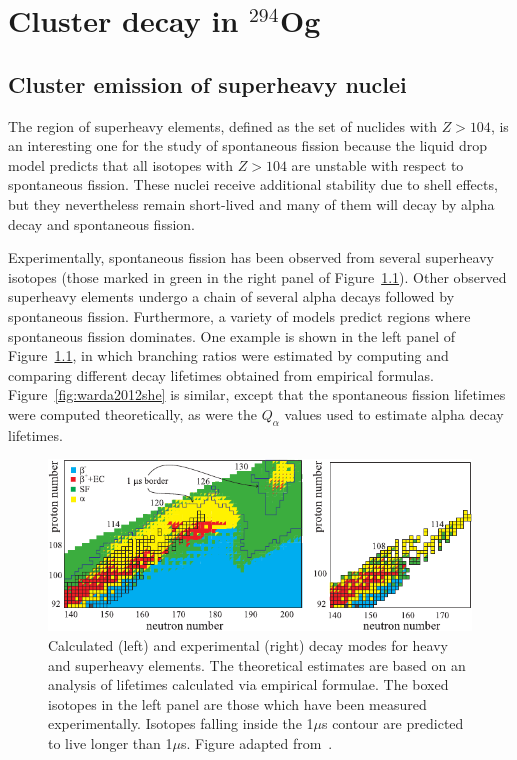 \chapter{Cluster decay in $^{294}$Og}\label{chap:294Og}

\section{Cluster emission of superheavy nuclei}

The region of superheavy elements, defined as the set of nuclides with $Z>104$, is an interesting one for the study of spontaneous fission because the liquid drop model predicts that all isotopes with $Z>104$ are unstable with respect to spontaneous fission. These nuclei receive additional stability due to shell effects, but they nevertheless remain short-lived and many of them will decay by alpha decay and spontaneous fission.

Experimentally, spontaneous fission has been observed from several superheavy isotopes (those marked in green in the right panel of Figure~\ref{fig:karpovshedecay}). Other observed superheavy elements undergo a chain of several alpha decays followed by spontaneous fission. Furthermore, a variety of models predict regions where spontaneous fission dominates. One example is shown in the left panel of Figure~\ref{fig:karpovshedecay}, in which branching ratios were estimated by computing and comparing different decay lifetimes obtained from empirical formulas. Figure~\ref{fig:warda2012she} is similar, except that the spontaneous fission lifetimes were computed theoretically, as were the $Q_\alpha$ values used to estimate alpha decay lifetimes.


\begin{figure}
	\centering
	\includegraphics[width=0.9\linewidth]{TeX_files/294Og_Karpov_SHEdecay}
	\caption{Calculated (left) and experimental (right) decay modes for heavy and superheavy elements. The theoretical estimates are based on an analysis of lifetimes calculated via empirical formulae. The boxed isotopes in the left panel are those which have been measured experimentally. Isotopes falling inside the 1$\mu$s contour are predicted to live longer than 1$\mu$s. Figure adapted from~\cite{Karpova}.}
	\label{fig:karpovshedecay}
\end{figure}


